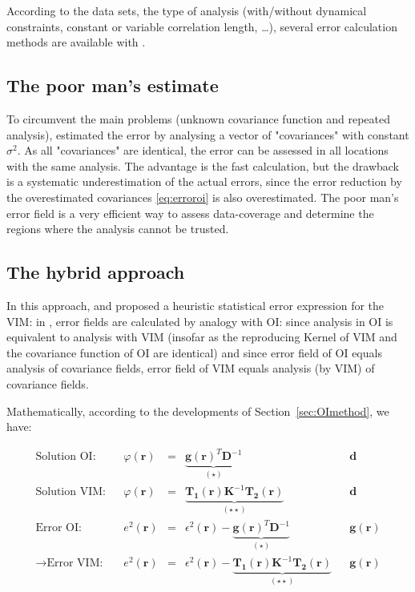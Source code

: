 According to the data sets, the type of analysis (with/without dynamical constraints, constant or variable correlation length, \ldots), several error calculation methods are available with \diva. 

\subsection{The poor man's estimate\label{sec:poormans}}

To circumvent the main problems (unknown covariance function and repeated analysis), \citet{BRASSEUR94} estimated the error by analysing a vector of "covariances" with constant $\sigma^2$. As all "covariances" are identical, the error can be assessed in all locations with the same analysis. The advantage is the fast calculation, but the drawback is a systematic underestimation of the actual errors, since the error reduction by the overestimated covariances \eqref{eq:erroroi} is also overestimated. The poor man's error field is a very efficient way to assess data-coverage and determine the regions where the analysis cannot be trusted.

\subsection{The hybrid approach}

In this approach, \cite{BRANKART98} and \cite{RIXEN00} proposed a heuristic statistical error expression for the VIM: in \diva, error fields are calculated by analogy with OI: since analysis in OI is equivalent to analysis with VIM (insofar as the reproducing Kernel of VIM and the covariance function of OI are identical) and since error field of OI equals analysis of covariance fields, error field of VIM equals analysis (by VIM) of covariance fields.

Mathematically, according to the developments of Section~\ref{sec:OImethod}, we have:

\begin{align}
\textrm{Solution OI:} 	&	& \varphi(\mathbf{r}) &=& \underbrace{\mathbf{g}(\mathbf{r})^{T}\mathbf{D}^{-1}}_{(\star)}		&& \mathbf{d}\\
\textrm{Solution VIM:}	&	& \varphi(\mathbf{r}) &=& \underbrace{\mathbf{T_{1}}(\mathbf{r})\mathbf{K}^{-1} \mathbf{T_{2}}(\mathbf{r})}_{(\star\star)} 																								&&\mathbf{d}\\
\textrm{Error~OI:}  	& 	& e^{2}(\mathbf{r})   &=& \epsilon^{2}(\mathbf{r})-\underbrace{\mathbf{g}(\mathbf{r})^{T}\mathbf{D}^{-1}}_{(\star)}														&&\mathbf{g}(\mathbf{r})	\\		
\rightarrow \textrm{Error~VIM:}		& 	& e^{2}(\mathbf{r})   &=& \epsilon^{2}(\mathbf{r})-\underbrace{\mathbf{T_{1}}(\mathbf{r})\mathbf{K}^{-1} \mathbf{T_{2}}(\mathbf{r})}_{(\star\star)}		&&\mathbf{g}(\mathbf{r})
\end{align}

